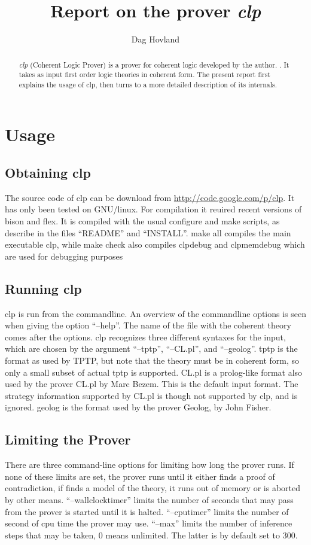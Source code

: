 \documentclass{report}
\author{Dag Hovland}
\title{Report on the prover \emph{clp}}
\begin{document}
\begin{abstract}
  \emph{clp} (Coherent Logic Prover) is a prover for coherent logic developed by the author. . It takes as input first order logic theories in coherent form. The present report first explains the usage of clp, then turns to a more detailed description of its internals.
\end{abstract}
\section{Usage}
\subsection{Obtaining clp}
The source code of clp can be download from \url{http://code.google.com/p/clp}. It has only been tested on GNU/linux. For compilation it reuired recent versions of bison and flex. It is compiled with the usual configure and make scripts, as describe in the files ``README'' and ``INSTALL''. make all compiles the main executable clp, while make check also compiles clpdebug and clpmemdebug which are used for debugging purposes
\subsection{Running clp}
clp is run from the commandline. An overview of the commandline options is seen when giving the option ``--help''. The name of the file with the coherent theory comes after the options. clp recognizes three different syntaxes for the input, which are chosen by the argument ``--tptp'', ``--CL.pl'', and ``--geolog''. tptp is the format as used by TPTP, but note that the theory must be in coherent form, so only a small subset of actual tptp is supported. CL.pl is a prolog-like format also used by the prover CL.pl by Marc Bezem. This is the default input format. The strategy information supported by CL.pl is though not supported by clp, and is ignored. geolog is the format used by the prover Geolog, by John Fisher.

\subsection{Limiting the Prover}
There are three command-line options for limiting how long the prover runs. If none of these limits are set, the prover runs until it either finds a proof of contradiction, if finds a model of the theory, it runs out of memory or is aborted by other means. ``--wallclocktimer'' limits the number of seconds that may pass from the prover is started until it is halted. ``--cputimer'' limits the number of second of cpu time the prover may use. ``--max'' limits the number of inference steps that may be taken, $0$ means unlimited. The latter is by default set to $300$.
\end{document}
